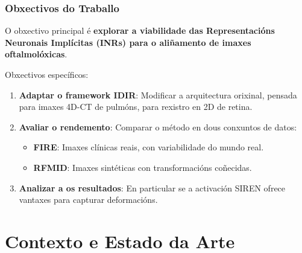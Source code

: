 \documentclass[xcolor=dvipsnames]{beamer}
\begin{document}
\begin{frame}
    \frametitle{Obxectivos do Traballo}
    
    O obxectivo principal é \textbf{explorar a viabilidade das Representacións Neuronais Implícitas (INRs) para o aliñamento de imaxes oftalmolóxicas}.
    
    \vspace{0.4cm}
    
    Obxectivos específicos:
    \begin{enumerate}
        \item \textbf{Adaptar o framework IDIR}: Modificar a arquitectura orixinal, pensada para imaxes 4D-CT de pulmóns, para rexistro en 2D de retina.
        \item \textbf{Avaliar o rendemento}: Comparar o método en dous conxuntos de datos:
        \begin{itemize}
            \item \textbf{FIRE}: Imaxes clínicas reais, con variabilidade do mundo real.
            \item \textbf{RFMID}: Imaxes sintéticas con transformacións coñecidas.
        \end{itemize}
        \item \textbf{Analizar a os resultados}: En particular se a activación SIREN ofrece vantaxes para capturar deformacións.
    \end{enumerate}
    
\end{frame}

\section{Contexto e Estado da Arte}
\end{document}
